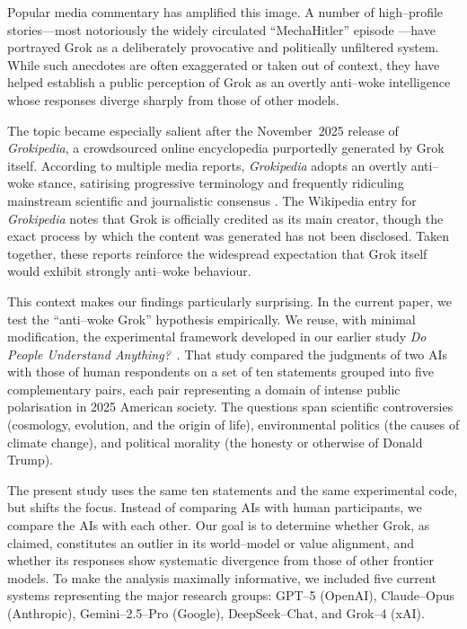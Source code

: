 \documentclass[12pt]{article}
\begin{document}
Popular media commentary has amplified this image.  A number of high--profile stories---most notoriously the widely circulated ``MechaHitler'' episode \citep{guardian2025grok_mechahitler,aljazeera2025grok_mechahitler,wired2025grok_antisemitic}
---have portrayed Grok as a deliberately provocative and politically unfiltered system.  While such anecdotes are often exaggerated or taken out of context, they have helped establish a public perception of Grok as an overtly anti--woke intelligence whose responses diverge sharply from those of other models.

The topic became especially salient after the November~2025 release of \emph{Grok\-ipedia}, a crowdsourced online encyclopedia purportedly generated by Grok itself.  According to multiple media reports, \emph{Grok\-ipedia} adopts an overtly anti--woke stance, satirising progressive terminology and frequently ridiculing mainstream scientific and journalistic consensus \citep{guardian2025grokipedia,techcrunch2025grokipedia,verge2025grokipedia,
wired2025grokipedia,people2025grokipedia,businessinsider2025grokipedia,
techpolicy2025grokipedia,vox2025grokipedia}.  The Wikipedia entry for \emph{Grokipedia} notes that Grok is officially credited as its main creator, though the exact process by which the content was generated has not been disclosed.  Taken together, these reports reinforce the widespread expectation that Grok itself would exhibit strongly anti--woke behaviour.

This context makes our findings particularly surprising.  In the current paper, we test the ``anti--woke Grok'' hypothesis empirically.  We reuse, with minimal modification, the experimental framework developed in our earlier study \emph{Do People Understand Anything?}~\citep{DoPeopleUnderstandAnything}.  That study compared the judgments of two AIs with those of human respondents on a set of ten statements grouped into five complementary pairs, each pair representing a domain of intense public polarisation in 2025 American society.  The questions span scientific controversies (cosmology, evolution, and the origin of life), environmental politics (the causes of climate change), and political morality (the honesty or otherwise of Donald Trump).

The present study uses the same ten statements and the same experimental code, but shifts the focus.  Instead of comparing AIs with human participants, we compare the AIs with each other.  Our goal is to determine whether Grok, as claimed, constitutes an outlier in its world--model or value alignment, and whether its responses show systematic divergence from those of other frontier models.  To make the analysis maximally informative, we included five current systems representing the major research groups: GPT--5 (OpenAI), Claude--Opus (Anthropic), Gemini--2.5--Pro (Google), DeepSeek--Chat, and Grok--4 (xAI).
\end{document}
